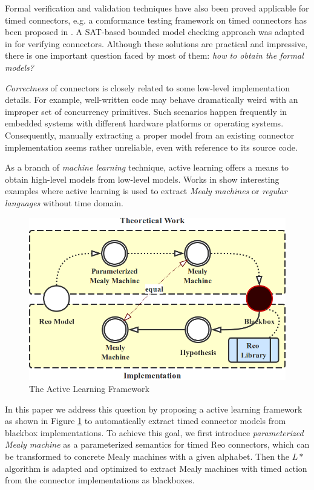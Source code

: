 \documentclass[conference, a4paper]{IEEEtran}
\begin{document}
Formal verification and validation techniques have also been proved applicable for timed connectors, 
e.g. a comformance testing framework on timed connectors has been proposed in \cite{DBLP:conf/tase/LiCWS15}.
A SAT-based bounded model checking approach was adapted in \cite{DBLP:journals/scp/Kemper12} for
verifying connectors. Although these solutions are practical and impressive, there is one important
question faced by most of them: \emph{how to obtain the formal models?}

\emph{Correctness} of connectors is closely related to some low-level implementation details.
For example, well-written code may behave dramatically weird with an improper set of concurrency
primitives. Such scenarios happen frequently in embedded systems with different hardware platforms or
operating systems. Consequently, manually extracting a proper model from an existing connector
implementation seems rather unreliable, even with reference to its source code.

As a branch of \emph{machine learning} technique, active learning offers a means to obtain
high-level models from low-level models. Works in \cite{de2010grammatical,
DBLP:journals/iandc/Angluin87, DBLP:conf/fase/RaffeltS06} show interesting examples where active
learning is used to extract \emph{Mealy machines} or \emph{regular languages} without time domain.

\begin{figure}[ht]
  \begin{center}
    \includegraphics[width=.4\textwidth]{./images/howto.png}
  \end{center}
  \caption{The Active Learning Framework}
  \label{fig:howto}
\end{figure}

In this paper we address this question by proposing a active learning framework as shown in Figure
\ref{fig:howto} to automatically extract timed connector models from blackbox implementations. 
To achieve this goal, we first introduce \emph{parameterized Mealy machine} as a parameterized
semantics for timed Reo connectors, which can be transformed to concrete Mealy machines with a
given alphabet. Then the $L*$ algorithm \cite{DBLP:journals/iandc/Angluin87} is adapted and
optimized to extract Mealy machines with timed action from the connector implementations as
blackboxes. 
\end{document}
